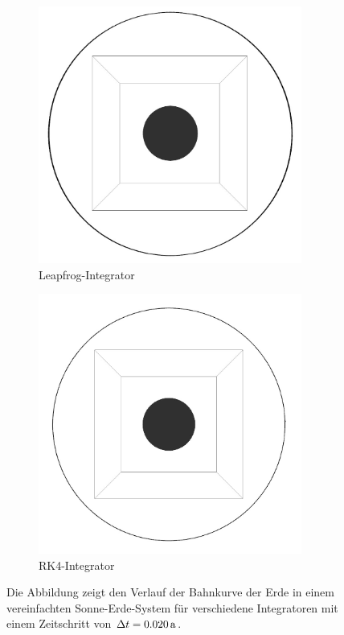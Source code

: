 \begin{figure}[p]
      \begin{subfigure}[b]{0.49\textwidth}
        \center
        \includegraphics[width=0.95\textwidth]{pictures/sun_earth/leapfrog_0_02.jpg}
        \caption{Leapfrog-Integrator}
      \end{subfigure}
      \begin{subfigure}[b]{0.49\textwidth}
        \center
        \includegraphics[width=0.95\textwidth]{pictures/sun_earth/rk4_0_02.jpg}
        \caption{RK4-Integrator}
      \end{subfigure}
      \caption{Die Abbildung zeigt den Verlauf der Bahnkurve der Erde in einem vereinfachten Sonne-Erde-System für verschiedene Integratoren mit einem Zeitschritt von $\Delta t = 0.020\,\mathrm{a}$.}
      \label{fig:sun_earth2}
    \end{figure}

